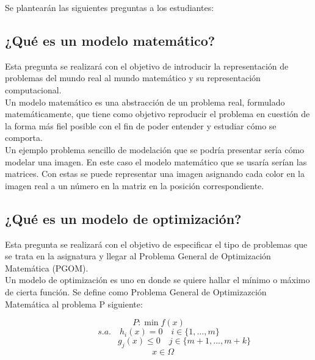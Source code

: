 \documentclass[a4paper,10pt,twocolumn]{article}
\theoremstyle{theorem}
\theoremstyle{definition}
\theoremstyle{remark}
\begin{document}
Se plantearán las siguientes preguntas a los estudiantes:

	\subsection{¿Qué es un modelo matemático?}\label{sub:results}

Esta pregunta se realizará con el objetivo de introducir la representación de problemas del mundo real al mundo matemático y su representación computacional.\\

Un modelo matemático es una abstracción de un problema real, formulado matemáticamente, que tiene como objetivo reproducir el problema en cuestión de la forma más fiel posible con el fin de poder entender y estudiar cómo se comporta.\\

Un ejemplo problema sencillo de modelación que se podría presentar sería cómo modelar una imagen. En este caso el modelo matemático que se usaría serían las matrices. Con estas se puede representar una imagen asignando cada color en la imagen real a un número en la matriz en la posición correspondiente. 

	\subsection{¿Qué es un modelo de optimización?}\label{sub:results}

Esta pregunta se realizará con el objetivo de especificar el tipo de problemas que se trata en la asignatura y llegar al Problema General de Optimización Matemática (PGOM).\\

Un modelo de optimización es uno en donde se quiere hallar el mínimo o máximo de cierta función. Se define como Problema General de Optimizazción Matemática al problema P siguiente:

$$
P: \min f(x)
$$
$$
s.a. \quad h_i(x) = 0 \quad i \in \{1,...,m\}
$$
$$
\qquad \qquad \qquad g_j(x) \le 0 \quad j \in \{m+1,...,m+k\}
$$
$$
\quad x \in \Omega
$$

\end{document}

